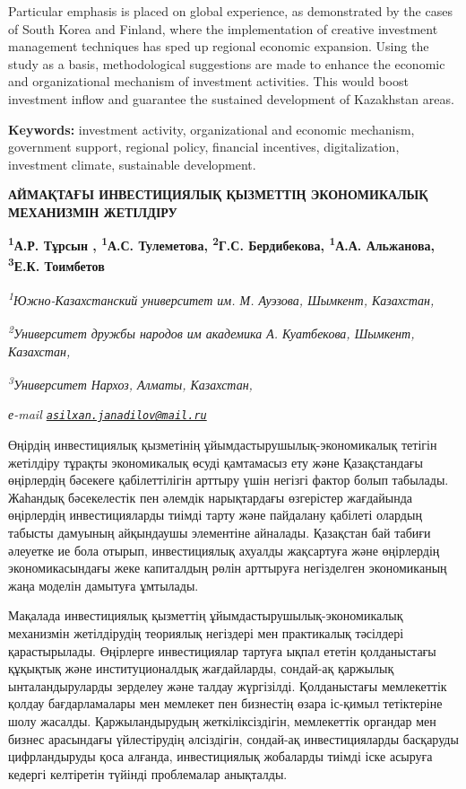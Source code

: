 Particular emphasis is placed on global experience, as demonstrated by
the cases of South Korea and Finland, where the implementation of
creative investment management techniques has sped up regional economic
expansion. Using the study as a basis, methodological suggestions are
made to enhance the economic and organizational mechanism of investment
activities. This would boost investment inflow and guarantee the
sustained development of Kazakhstan areas.

{\bfseries Keywords:} investment activity, organizational and economic
mechanism, government support, regional policy, financial incentives,
digitalization, investment climate, sustainable development.

\begin{articleheader}
{\bfseries АЙМАҚТАҒЫ ИНВЕСТИЦИЯЛЫҚ ҚЫЗМЕТТІҢ ЭКОНОМИКАЛЫҚ МЕХАНИЗМІН ЖЕТІЛДІРУ}

{\bfseries
\textsuperscript{1}А.Р. Тұрсын \textsuperscript{\envelope },
\textsuperscript{1}А.С. Тулеметова,
\textsuperscript{2}Г.С. Бердибекова,
\textsuperscript{1}А.А. Альжанова,
\textsuperscript{3}Е.К. Тоимбетов}
\end{articleheader}

\begin{affiliation}
\emph{\textsuperscript{1}Южно-Казахстанский университет им. М. Ауэзова, Шымкент, Казахстан,}

\emph{\textsuperscript{2}Университет дружбы народов им академика А. Куатбекова, Шымкент, Казахстан,}

\emph{\textsuperscript{3}Университет Нархоз, Алматы, Казахстан,}

\emph{е-mail \href{mailto:asilxan.janadilov@mail.ru}{\nolinkurl{asilxan.janadilov@mail.ru}}}
\end{affiliation}

Өңірдің инвестициялық қызметінің ұйымдастырушылық-экономикалық тетігін
жетілдіру тұрақты экономикалық өсуді қамтамасыз ету және Қазақстандағы
өңірлердің бәсекеге қабілеттілігін арттыру үшін негізгі фактор болып
табылады. Жаһандық бәсекелестік пен әлемдік нарықтардағы өзгерістер
жағдайында өңірлердің инвестицияларды тиімді тарту және пайдалану
қабілеті олардың табысты дамуының айқындаушы элементіне айналады.
Қазақстан бай табиғи әлеуетке ие бола отырып, инвестициялық ахуалды
жақсартуға және өңірлердің экономикасындағы жеке капиталдың рөлін
арттыруға негізделген экономиканың жаңа моделін дамытуға ұмтылады.

Мақалада инвестициялық қызметтің ұйымдастырушылық-экономикалық
механизмін жетілдірудің теориялық негіздері мен практикалық тәсілдері
қарастырылады. Өңірлерге инвестициялар тартуға ықпал ететін қолданыстағы
құқықтық және институционалдық жағдайларды, сондай-ақ қаржылық
ынталандыруларды зерделеу және талдау жүргізілді. Қолданыстағы
мемлекеттік қолдау бағдарламалары мен мемлекет пен бизнестің өзара
іс-қимыл тетіктеріне шолу жасалды. Қаржыландырудың жеткіліксіздігін,
мемлекеттік органдар мен бизнес арасындағы үйлестірудің әлсіздігін,
сондай-ақ инвестицияларды басқаруды цифрландыруды қоса алғанда,
инвестициялық жобаларды тиімді іске асыруға кедергі келтіретін түйінді
проблемалар анықталды.

